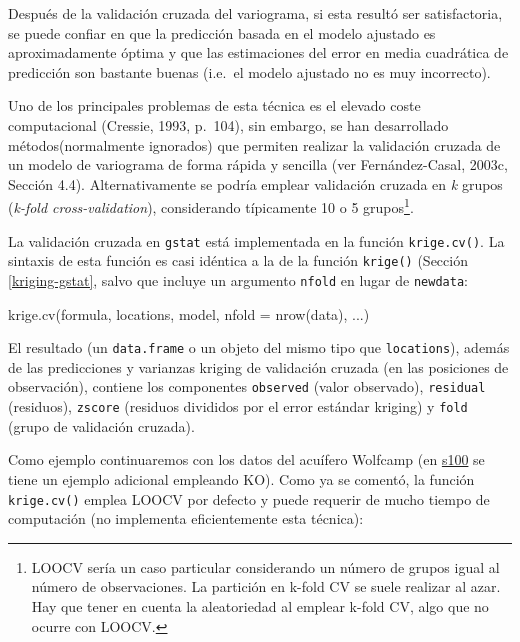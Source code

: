 \documentclass[
  spanish,
]{book}
\newenvironment{Shaded}{\begin{snugshade}}{\end{snugshade}}
\newcommand{\AttributeTok}[1]{\textcolor[rgb]{0.77,0.63,0.00}{#1}}
\newcommand{\FunctionTok}[1]{\textcolor[rgb]{0.00,0.00,0.00}{#1}}
\newcommand{\NormalTok}[1]{#1}
\theoremstyle{break}
\theoremstyle{definition}
\theoremstyle{definition}
\theoremstyle{definition}
\theoremstyle{definition}
\theoremstyle{remark}
\begin{document}
Después de la validación cruzada del variograma, si esta resultó ser satisfactoria, se puede confiar en que la predicción basada en el modelo ajustado es aproximadamente óptima y que las estimaciones del error en media cuadrática de predicción son bastante buenas (i.e.~el modelo ajustado no es muy incorrecto).

Uno de los principales problemas de esta técnica es el elevado coste computacional (Cressie, 1993, p.~104), sin embargo, se han desarrollado métodos(normalmente ignorados) que permiten realizar la validación cruzada de un modelo de variograma de forma rápida y sencilla (ver Fernández-Casal, 2003c, Sección 4.4).
Alternativamente se podría emplear validación cruzada en \emph{k} grupos (\emph{k-fold cross-validation}), considerando típicamente 10 o 5 grupos\footnote{LOOCV sería un caso particular considerando un número de grupos igual al número de observaciones. La partición en k-fold CV se suele realizar al azar. Hay que tener en cuenta la aleatoriedad al emplear k-fold CV, algo que no ocurre con LOOCV.}.

La validación cruzada en \texttt{gstat} está implementada en la función \texttt{krige.cv()}.
La sintaxis de esta función es casi idéntica a la de la función \texttt{krige()} (Sección \ref{kriging-gstat}, salvo que incluye un argumento \texttt{nfold} en lugar de \texttt{newdata}:

\begin{Shaded}
\begin{Highlighting}[]
\FunctionTok{krige.cv}\NormalTok{(formula, locations, model, }\AttributeTok{nfold =} \FunctionTok{nrow}\NormalTok{(data), ...)}
\end{Highlighting}
\end{Shaded}

El resultado (un \texttt{data.frame} o un objeto del mismo tipo que \texttt{locations}), además de las predicciones y varianzas kriging de validación cruzada (en las posiciones de observación), contiene los componentes \texttt{observed} (valor observado), \texttt{residual} (residuos), \texttt{zscore} (residuos divididos por el error estándar kriging) y \texttt{fold} (grupo de validación cruzada).

Como ejemplo continuaremos con los datos del acuífero Wolfcamp (en \href{s100.html}{s100} se tiene un ejemplo adicional empleando KO).
Como ya se comentó, la función \texttt{krige.cv()} emplea LOOCV por defecto y puede requerir de mucho tiempo de computación (no implementa eficientemente esta técnica):
\end{document}
